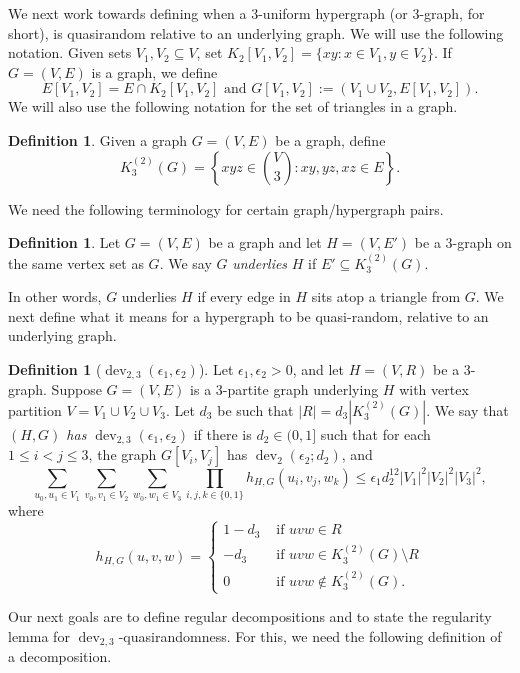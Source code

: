 \documentclass[12pt,oneside,british,a4wide]{amsart}
\numberwithin{equation}{section}
\theoremstyle{definition}
\newtheorem{definition}[theorem]{Definition}
\def\e{\epsilon}
\def\dev{\operatorname{dev}}
\begin{document}
We next work towards defining when a 3-uniform hypergraph (or 3-graph, for short), is quasirandom relative to an underlying graph.  We will use the following notation. Given sets $V_1,V_2\subseteq V$, set $K_2[V_1,V_2]=\{xy: x\in V_1, y\in V_2\}$.  If  $G=(V,E)$ is a graph, we define 
$$
E[V_1,V_2]=E\cap K_2[V_1,V_2]\text{ and }G[V_1,V_2]:=(V_1\cup V_2,E[V_1,V_2]).  
$$
We will also use the following notation for the set of triangles in a graph.

\begin{definition}
Given a graph $G=(V,E)$ be a graph, define
\[K_3^{(2)}(G)=\left\{xyz\in {V\choose 3}: xy, yz, xz \in E\right\}.\]
\end{definition}

We need the following terminology for certain graph/hypergraph pairs.

\begin{definition}
Let $G=(V,E)$ be a graph and let  $H=(V,E')$ be a $3$-graph on the same vertex set as $G$.  We say $G$ \emph{underlies} $H$ if $E'\subseteq K_3^{(2)}(G)$.
\end{definition}


In other words,  $G$ underlies $H$ if every edge in $H$ sits atop a triangle from $G$. We next define what it means for a hypergraph to be quasi-random, relative to an underlying graph.

\begin{definition}[$\dev_{2,3}(\e_1,\e_2)$]\label{def:regtrip}
Let $\e_1,\e_2>0$, and let $H=(V,R)$ be a $3$-graph. Suppose $G=(V,E)$ is a $3$-partite graph underlying $H$ with vertex partition $V=V_1\cup V_2\cup V_3$.  Let $d_3$ be such that $|R|=d_3|K_3^{(2)}(G)|$.  We say that \emph{$(H,G)$ has $\dev_{2,3}(\e_1,\e_2)$} if there is $d_2\in (0,1]$ such that for each $1\leq i<j\leq 3$, the graph $G[V_i,V_j]$ has $\dev_2(\e_2;d_2)$, and 
$$
\sum_{u_0,u_1\in V_1}\sum_{v_0,v_1\in V_2}\sum_{w_0,w_1\in V_3}\prod_{i,j,k\in \{0,1\}}h_{H,G}(u_i,v_j,w_k)\leq \e_1d_2^{12}|V_1|^2|V_2|^2|V_3|^2,
$$
where 
\[h_{H,G}(u,v,w)=\begin{cases}
1-d_3 &\text{ if }uvw\in R\\
-d_3 &\text{ if }uvw\in K_3^{(2)}(G)\setminus R\\
0&\text{ if }uvw\notin K_3^{(2)}(G).
\end{cases}\]
\end{definition}

Our next goals are to define regular decompositions and to state the regularity lemma for $\dev_{2,3}$-quasirandomness.  For this, we need the following definition of a decomposition.
\end{document}
